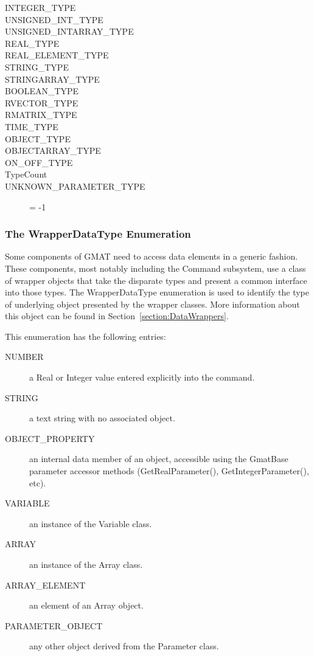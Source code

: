 \begin{description}
\item[INTEGER\_TYPE]
\item[UNSIGNED\_INT\_TYPE]
\item[UNSIGNED\_INTARRAY\_TYPE]
\item[REAL\_TYPE]
\item[REAL\_ELEMENT\_TYPE]
\item[STRING\_TYPE]
\item[STRINGARRAY\_TYPE]
\item[BOOLEAN\_TYPE]
\item[RVECTOR\_TYPE]
\item[RMATRIX\_TYPE]
\item[TIME\_TYPE]
\item[OBJECT\_TYPE]
\item[OBJECTARRAY\_TYPE]
\item[ON\_OFF\_TYPE]
\item[TypeCount]
\item[UNKNOWN\_PARAMETER\_TYPE] = -1
\end{description}


\subsubsection{\label{section:WrapperDataTypeEnum}The WrapperDataType Enumeration}

Some components of GMAT need to access data elements in a generic fashion.  These components, most
notably including the Command subsystem, use a class of wrapper objects that take the disparate
types and present a common interface into those types.  The WrapperDataType enumeration is used to
identify the type of underlying object presented by the wrapper classes.  More information about
this object can be found in Section~\ref{section:DataWrappers}.

This enumeration has the following entries:

\begin{description}
\item[NUMBER] a Real or Integer value entered explicitly into the command.
\item[STRING] a text string with no associated object.
\item[OBJECT\_PROPERTY] an internal data member of an object, accessible using the GmatBase
parameter accessor methods (GetRealParameter(), GetIntegerParameter(), etc).
\item[VARIABLE] an instance of the Variable class.
\item[ARRAY] an instance of the Array class.
\item[ARRAY\_ELEMENT] an element of an Array object.
\item[PARAMETER\_OBJECT] any other object derived from the Parameter class.
\end{description}


